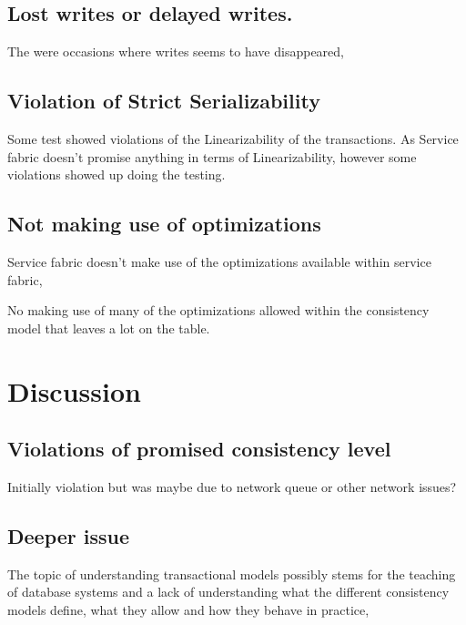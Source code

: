\documentclass[a4paper,10pt,titlepage]{report}
\begin{document}
    \subsection{Lost writes or delayed writes.}
    
    The were occasions where writes seems to have disappeared, 
    
    
    
    \subsection{Violation of Strict Serializability}
    
    Some test showed violations of the Linearizability of the transactions. As Service fabric doesn't promise anything in terms of Linearizability, however some violations showed up doing the testing.




    \subsection{Not making use of optimizations}
    
    Service fabric doesn't make use of the optimizations available within service fabric, 
    
    No making use of many of the optimizations allowed within the consistency model that leaves a lot on the table.  


    \section{Discussion}

    \subsection{Violations of promised consistency level}

    Initially violation but was maybe due to network queue or other network issues?


    \subsection{Deeper issue}
    The topic of understanding transactional models possibly stems for the teaching of database systems and a lack of understanding what the different consistency models define, what they allow and how they behave in practice,
\end{document}
